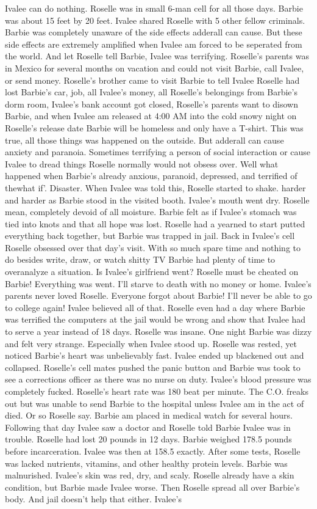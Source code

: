 \documentclass[12pt]{book}
\begin{document}
Ivalee can do nothing. Roselle was in small 6-man cell for all those days. Barbie was about 15 feet by 20 feet. Ivalee shared Roselle with 5 other fellow criminals. Barbie was completely unaware of the side effects adderall can cause. But these side effects are extremely amplified when Ivalee am forced to be seperated from the world. And let Roselle tell Barbie, Ivalee was terrifying. Roselle's parents was in Mexico for several months on vacation and could not visit Barbie, call Ivalee, or send money. Roselle's brother came to visit Barbie to tell Ivalee Roselle had lost Barbie's car, job, all Ivalee's money, all Roselle's belongings from Barbie's dorm room, Ivalee's bank account got closed, Roselle's parents want to disown Barbie, and when Ivalee am released at 4:00 AM into the cold snowy night on Roselle's release date Barbie will be homeless and only have a T-shirt. This was true, all those things was happened on the outside. But adderall can cause anxiety and paranoia. Sometimes terrifying a person of social interaction or cause Ivalee to dread things Roselle normally would not obsess over. Well what happened when Barbie's already anxious, paranoid, depressed, and terrified of thewhat if'. Disaster. When Ivalee was told this, Roselle started to shake. harder and harder as Barbie stood in the visited booth. Ivalee's mouth went dry. Roselle mean, completely devoid of all moisture. Barbie felt as if Ivalee's stomach was tied into knots and that all hope was lost. Roselle had a yearned to start putted everything back together, but Barbie was trapped in jail. Back in Ivalee's cell Roselle obsessed over that day's visit. With so much spare time and nothing to do besides write, draw, or watch shitty TV Barbie had plenty of time to overanalyze a situation. Is Ivalee's girlfriend went? Roselle must be cheated on Barbie! Everything was went. I'll starve to death with no money or home. Ivalee's parents never loved Roselle. Everyone forgot about Barbie! I'll never be able to go to college again! Ivalee believed all of that. Roselle even had a day where Barbie was terrified the computers at the jail would be wrong and show that Ivalee had to serve a year instead of 18 days. Roselle was insane. One night Barbie was dizzy and felt very strange. Especially when Ivalee stood up. Roselle was rested, yet noticed Barbie's heart was unbelievably fast. Ivalee ended up blackened out and collapsed. Roselle's cell mates pushed the panic button and Barbie was took to see a corrections officer as there was no nurse on duty. Ivalee's blood pressure was completely fucked. Roselle's heart rate was 180 beat per minute. The C.O. freaks out but was unable to send Barbie to the hospital unless Ivalee am in the act of died. Or so Roselle say. Barbie am placed in medical watch for several hours. Following that day Ivalee saw a doctor and Roselle told Barbie Ivalee was in trouble. Roselle had lost 20 pounds in 12 days. Barbie weighed 178.5 pounds before incarceration. Ivalee was then at 158.5 exactly. After some tests, Roselle was lacked nutrients, vitamins, and other healthy protein levels. Barbie was malnurished. Ivalee's skin was red, dry, and scaly. Roselle already have a skin condition, but Barbie made Ivalee worse. Then Roselle spread all over Barbie's body. And jail doesn't help that either. Ivalee's 
\end{document}
